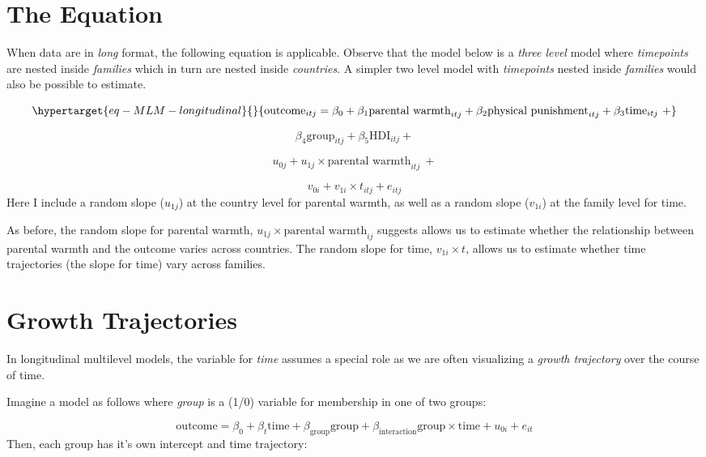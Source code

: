 \documentclass[
  letterpaper,
  DIV=11,
  numbers=noendperiod]{scrreprt}
\begin{document}
\hypertarget{the-equation-1}{%
\section{The Equation}\label{the-equation-1}}

When data are in \emph{long} format, the following equation is
applicable. Observe that the model below is a \emph{three level} model
where \emph{timepoints} are nested inside \emph{families} which in turn
are nested inside \emph{countries}. A simpler two level model with
\emph{timepoints} nested inside \emph{families} would also be possible
to estimate.

\begin{equation}\protect\hypertarget{eq-MLM-longitudinal}{}{\text{outcome}_{itj} = \beta_0 + \beta_1 \text{parental warmth}_{itj} + \beta_2 \text{physical punishment}_{itj} + \beta_3 \text{time}_{itj} \ + }\label{eq-MLM-longitudinal}\end{equation}

\[\beta_4 \text{group}_{itj} + \beta_5 \text{HDI}_{itj} +\]

\[u_{0j} + u_{1j} \times \text{parental warmth}_{itj} \ + \]

\[v_{0i} + v_{1i} \times t_{itj} + e_{itj}\] Here I include a random
slope (\(u_{1j}\)) at the country level for parental warmth, as well as
a random slope (\(v_{1i}\)) at the family level for time.

As before, the random slope for parental warmth,
\(u_{1j} \times \text{parental warmth}_{ij}\) suggests allows us to
estimate whether the relationship between parental warmth and the
outcome varies across countries. The random slope for time,
\(v_{1i} \times t\), allows us to estimate whether time trajectories
(the slope for time) vary across families.

\hypertarget{growth-trajectories}{%
\section{Growth Trajectories}\label{growth-trajectories}}

In longitudinal multilevel models, the variable for \emph{time} assumes
a special role as we are often visualizing a \emph{growth trajectory}
over the course of time.

Imagine a model as follows where \emph{group} is a (1/0) variable for
membership in one of two groups:

\[\text{outcome} = \beta_0 + \beta_t \text{time} + \beta_\text{group} \text{group} + \beta_\text{interaction} \text{group} \times \text{time} + u_{0i} + e_{it}\]
Then, each group has it's own intercept and time trajectory:
\end{document}
